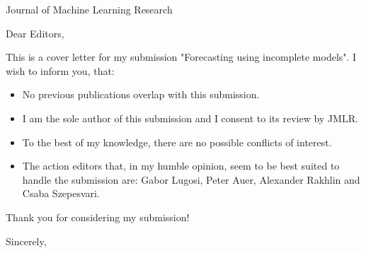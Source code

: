 \documentclass{letter}
\begin{document}


\address{Email: vanessa.kosoy@intelligence.org\\Post: Shraga Rafaeli 3/15\\
Petah Tikva\\
Israel}

\begin{letter}{Journal of Machine Learning Research} %

\opening{Dear Editors,}

This is a cover letter for my submission "Forecasting using incomplete models". I wish to inform you, that:

\begin{itemize}
\item No previous publications overlap with this submission.
\item I am the sole author of this submission and I consent to its review by JMLR.
\item To the best of my knowledge, there are no possible conflicts of interest.
\item The action editors that, in my humble opinion, seem to be best suited to handle the submission are: Gabor Lugosi, Peter Auer, Alexander Rakhlin and Csaba Szepesvari.
\end{itemize}

Thank you for considering my submission!

\signature{Vanessa Kosoy}
\closing{Sincerely,}




\end{letter}
\end{document}
